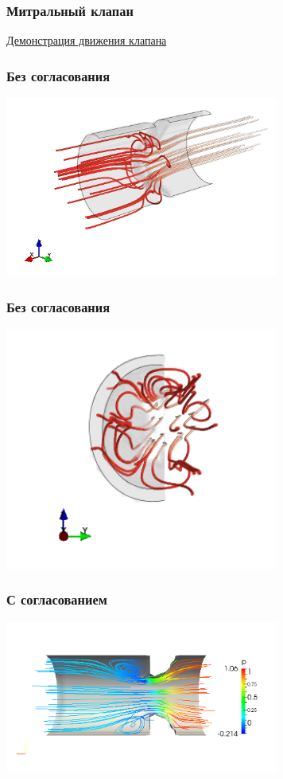 \documentclass[14pt, notes]{beamer}
\begin{document}
\begin{frame}
\frametitle{Митральный клапан}
    \begin{center}
        \href{run:video/MV\_side.mov}{Демонстрация движения клапана}
    \end{center}
\end{frame}

\begin{frame}
\frametitle{Без согласования}
    \begin{center}
    \includegraphics[width=9cm]{images/valves_resized_with_bound.png}
    \end{center}
\end{frame}

\begin{frame}
\frametitle{Без согласования}
    \begin{center}
    \includegraphics[width=9cm]{images/valves_resized_with_bound_front.png}
    \end{center}
\end{frame}

\begin{frame}
\frametitle{С согласованием}
    \begin{center}
    \includegraphics[width=9cm]{images/valves_simple.png}
    \end{center}
\end{frame}
\end{document}
